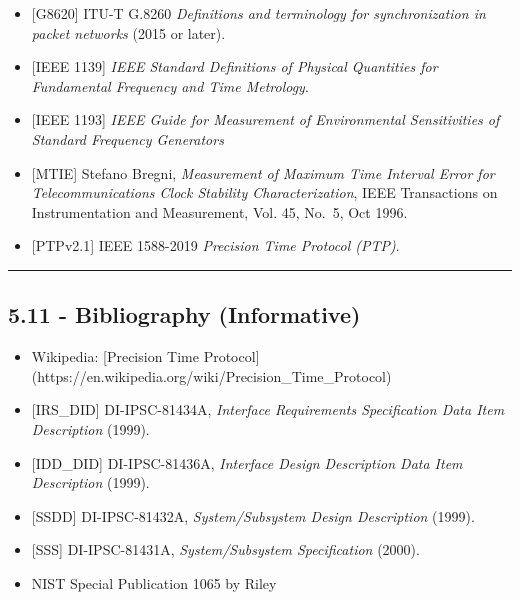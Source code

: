 \begin{itemize}
\tightlist
\item
  {[}G8620{]} ITU-T G.8260 \emph{Definitions and terminology for
  synchronization in packet networks} (2015 or later).\\
\item
  {[}IEEE 1139{]} \emph{IEEE Standard Definitions of Physical Quantities
  for Fundamental Frequency and Time Metrology}.
\item
  {[}IEEE 1193{]} \emph{IEEE Guide for Measurement of Environmental
  Sensitivities of Standard Frequency Generators}
\item
  {[}MTIE{]} Stefano Bregni, \emph{Measurement of Maximum Time Interval
  Error for Telecommunications Clock Stability Characterization}, IEEE
  Transactions on Instrumentation and Measurement, Vol. 45, No.~5, Oct
  1996.\\
\item
  {[}PTPv2.1{]} IEEE 1588-2019 \emph{Precision Time Protocol (PTP)}.
\end{itemize}

\begin{center}\rule{0.5\linewidth}{0.5pt}\end{center}

\subsection{5.11 - Bibliography
(Informative)}\label{bibliography-informative}

\begin{itemize}
\tightlist
\item
  Wikipedia: {[}Precision Time Protocol{]}
  (https://en.wikipedia.org/wiki/Precision\_Time\_Protocol)\\
\item
  {[}IRS\_DID{]} DI-IPSC-81434A, \emph{Interface Requirements
  Specification Data Item Description} (1999).\\
\item
  {[}IDD\_DID{]} DI-IPSC-81436A, \emph{Interface Design Description Data
  Item Description} (1999).\\
\item
  {[}SSDD{]} DI-IPSC-81432A, \emph{System/Subsystem Design Description}
  (1999).\\
\item
  {[}SSS{]} DI-IPSC-81431A, \emph{System/Subsystem Specification}
  (2000).
\item
  NIST Special Publication 1065 by Riley
\end{itemize}

